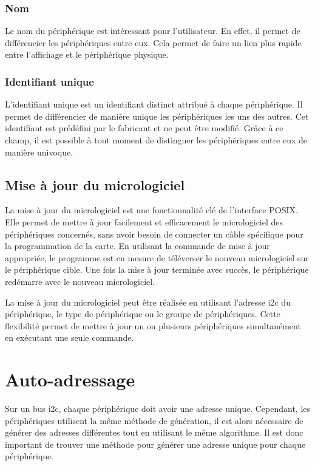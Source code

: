 \subsubsection{Nom}

Le nom du périphérique est intéressant pour l'utilisateur. En effet, il permet de différencier les périphériques entre eux. Cela permet de faire un lien plus rapide entre l'affichage et le périphérique physique.

\subsubsection{Identifiant unique}

L'identifiant unique est un identifiant distinct attribué à chaque périphérique.
Il permet de différencier de manière unique les périphériques les uns des autres.
Cet identifiant est prédéfini par le fabricant et ne peut être modifié.
Grâce à ce champ, il est possible à tout moment de distinguer les périphériques entre eux de manière univoque.

\subsection{Mise à jour du micrologiciel}

La mise à jour du micrologiciel est une fonctionnalité clé de l'interface POSIX.
Elle permet de mettre à jour facilement et efficacement le micrologiciel des périphériques concernés, sans avoir besoin de connecter un câble spécifique pour la programmation de la carte.
En utilisant la commande de mise à jour appropriée, le programme est en mesure de téléverser le nouveau micrologiciel sur le périphérique cible.
Une fois la mise à jour terminée avec succès, le périphérique redémarre avec le nouveau micrologiciel.

La mise à jour du micrologiciel peut être réalisée en utilisant l'adresse \gls{i2c} du périphérique, le type de périphérique ou le groupe de périphériques.
Cette flexibilité permet de mettre à jour un ou plusieurs périphériques simultanément en exécutant une seule commande.

\section{Auto-adressage}

Sur un bus \gls{i2c}, chaque périphérique doit avoir une adresse unique.
Cependant, les périphériques utilisent la même méthode de génération, il est alors nécessaire de générer des adresses différentes tout en utilisant le même algorithme.
Il est donc important de trouver une méthode pour générer une adresse unique pour chaque périphérique.

